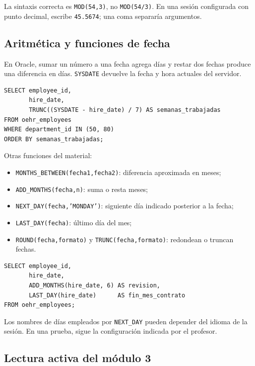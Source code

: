 \documentclass[11pt,a4paper]{article}
\newcommand{\campo}[1]{\texttt{#1}}
\begin{document}
\begin{errorbox}
La sintaxis correcta es \campo{MOD(54,3)}, no \campo{MOD(54/3)}. En una sesión configurada con punto
decimal, escribe \campo{45.5674}; una coma separaría argumentos.
\end{errorbox}

\subsection{Aritmética y funciones de fecha}

En Oracle, sumar un número a una fecha agrega días y restar dos fechas produce una diferencia en
días. \campo{SYSDATE} devuelve la fecha y hora actuales del servidor.

\begin{lstlisting}
SELECT employee_id,
       hire_date,
       TRUNC((SYSDATE - hire_date) / 7) AS semanas_trabajadas
FROM oehr_employees
WHERE department_id IN (50, 80)
ORDER BY semanas_trabajadas;
\end{lstlisting}

Otras funciones del material:

\begin{itemize}
  \item \campo{MONTHS\_BETWEEN(fecha1,fecha2)}: diferencia aproximada en meses;
  \item \campo{ADD\_MONTHS(fecha,n)}: suma o resta meses;
  \item \campo{NEXT\_DAY(fecha,'MONDAY')}: siguiente día indicado posterior a la fecha;
  \item \campo{LAST\_DAY(fecha)}: último día del mes;
  \item \campo{ROUND(fecha,formato)} y \campo{TRUNC(fecha,formato)}: redondean o truncan fechas.
\end{itemize}

\begin{lstlisting}
SELECT employee_id,
       hire_date,
       ADD_MONTHS(hire_date, 6) AS revision,
       LAST_DAY(hire_date)      AS fin_mes_contrato
FROM oehr_employees;
\end{lstlisting}

Los nombres de días empleados por \campo{NEXT\_DAY} pueden depender del idioma de la sesión. En una
prueba, sigue la configuración indicada por el profesor.

\subsection{Lectura activa del módulo 3}
\end{document}
